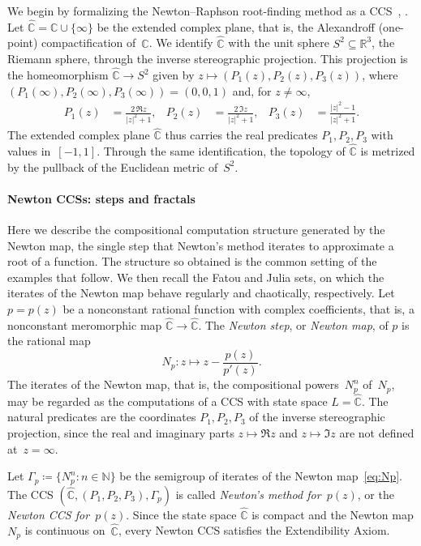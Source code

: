 \documentclass[psamsfonts]{amsart}
\theoremstyle{definition}
\theoremstyle{remark}
\newcommand{\hatC}{\hat{\mathbb{C}}}
\numberwithin{equation}{section}
\begin{document}
We begin by formalizing the Newton--Raphson root-finding method as a CCS~\cite{Galantai200025}, \cite[Section~2.3]{Burden2016numerical}.
Let $\hatC = \mathbb{C}\cup\{\infty\}$ be the extended complex plane, that is, the Alexandroff (one-point) compactification of~$\mathbb{C}$.
We identify $\hatC$ with the unit sphere $S^2\subseteq \mathbb{R}^3$, the Riemann sphere, through the inverse stereographic projection.
This projection is the homeomorphism $\hatC\to S^2$ given by $z \mapsto (P_1(z), P_2(z), P_3(z))$, where $(P_1(\infty), P_2(\infty), P_3(\infty)) = (0,0,1)$ and, for $z\ne\infty$,
\begin{align*}
P_1(z) & = \frac{2\,\Re{z}}{|z|^2+1}, &
P_2(z) & = \frac{2\,\Im{z}}{|z|^2+1}, &
P_3(z) & = \frac{|z|^2-1}{|z|^2+1}.
\end{align*}
The extended complex plane $\hatC$ thus carries the real predicates $P_1, P_2, P_3$ with values in~$[-1,1]$.
Through the same identification, the topology of $\hatC$ is metrized by the pullback of the Euclidean metric of~$S^2$.

\paragraph{Newton CCSs: steps and fractals}
\label{sec:Newton-map}
Here we describe the compositional computation structure generated by the Newton map, the single step that Newton's method iterates to approximate a root of a function.
The structure so obtained is the common setting of the examples that follow.
We then recall the Fatou and Julia sets, on which the iterates of the Newton map behave regularly and chaotically, respectively.
Let $p = p(z)$ be a nonconstant rational function with complex coefficients, that is, a nonconstant meromorphic map $\hatC\to\hatC$.
The \emph{Newton step}, or \emph{Newton map}, of $p$ is the rational map
\begin{equation}\label{eq:Np}
N_p: z \mapsto z-\frac{p(z)}{p'(z)}.
\end{equation}
The iterates of the Newton map, that is, the compositional powers~$N_p^n$ of~$N_p$, may be regarded as the computations of a CCS with state space $L = \hatC$.
The natural predicates are the coordinates $P_1, P_2, P_3$ of the inverse stereographic projection, since the real and imaginary parts $z\mapsto\Re{z}$ and $z\mapsto\Im{z}$ are not defined at~$z = \infty$.

Let $\Gamma_p\coloneqq\{N_p^n:n\in\mathbb{N}\}$ be the semigroup of iterates of the Newton map~\eqref{eq:Np}.
The CCS $(\hatC, (P_1,P_2,P_3), \Gamma_p)$ is called \emph{Newton’s method for~$p(z)$}, or the \emph{Newton CCS for~$p(z)$}.
Since the state space $\hatC$ is compact and the Newton map $N_p$ is continuous on~$\hatC$, every Newton CCS satisfies the Extendibility Axiom.
\end{document}
